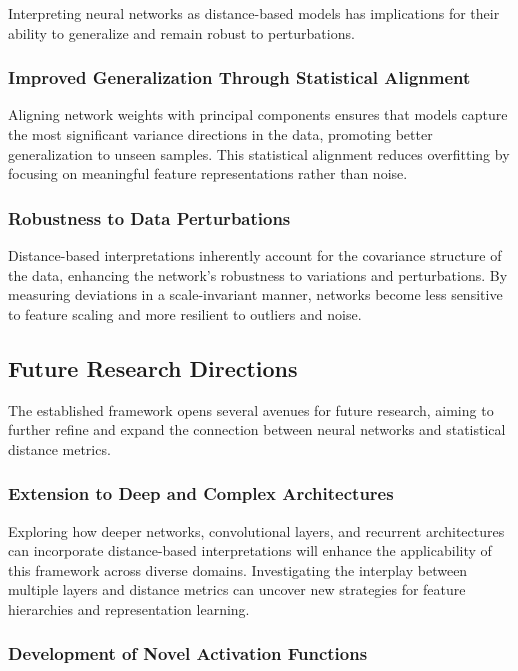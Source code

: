 Interpreting neural networks as distance-based models has implications for their ability to generalize and remain robust to perturbations.

\subsubsection{Improved Generalization Through Statistical Alignment}

Aligning network weights with principal components ensures that models capture the most significant variance directions in the data, promoting better generalization to unseen samples. This statistical alignment reduces overfitting by focusing on meaningful feature representations rather than noise.

\subsubsection{Robustness to Data Perturbations}

Distance-based interpretations inherently account for the covariance structure of the data, enhancing the network's robustness to variations and perturbations. By measuring deviations in a scale-invariant manner, networks become less sensitive to feature scaling and more resilient to outliers and noise.

\subsection{Future Research Directions}

The established framework opens several avenues for future research, aiming to further refine and expand the connection between neural networks and statistical distance metrics.

\subsubsection{Extension to Deep and Complex Architectures}

Exploring how deeper networks, convolutional layers, and recurrent architectures can incorporate distance-based interpretations will enhance the applicability of this framework across diverse domains. Investigating the interplay between multiple layers and distance metrics can uncover new strategies for feature hierarchies and representation learning.

\subsubsection{Development of Novel Activation Functions}

